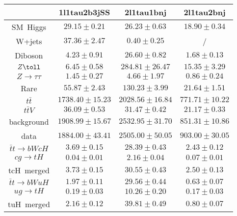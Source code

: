\begin{tabular}{|c|c|c|c|} \hline
 & 1l1tau2b3jSS & 2l1tau1bnj & 2l1tau2bnj\\\hline
SM~Higgs & $29.15\pm0.21$ & $26.23\pm0.63$ & $18.90\pm0.34$\\\hline
W+jets & $37.36\pm2.47$ & $0.40\pm0.25$ &  /\\\hline
Diboson & $4.23\pm0.91$ & $26.60\pm0.82$ & $1.68\pm0.13$\\\hline
$Z\toll$ & $6.45\pm0.58$ & $284.81\pm26.47$ & $15.35\pm3.29$\\\hline
$Z\to\tau\tau$ & $1.45\pm0.27$ & $4.66\pm1.97$ & $0.86\pm0.24$\\\hline
Rare & $55.87\pm2.43$ & $130.23\pm3.99$ & $21.64\pm1.51$\\\hline
$t\bar{t}$ & $1738.40\pm15.23$ & $2028.56\pm16.84$ & $771.71\pm10.22$\\\hline
$t\bar{t}V$ & $36.09\pm0.53$ & $31.47\pm0.42$ & $21.17\pm0.33$\\\hline
background & $1908.99\pm15.67$ & $2532.95\pm31.70$ & $851.31\pm10.86$\\\hline
data & $1884.00\pm43.41$ & $2505.00\pm50.05$ & $903.00\pm30.05$\\\hline
$\bar{t}t\to bWcH$ & $3.69\pm0.15$ & $28.39\pm0.43$ & $2.43\pm0.12$\\\hline
$cg\to tH$ & $0.04\pm0.01$ & $2.16\pm0.04$ & $0.07\pm0.01$\\\hline
tcH~merged & $3.73\pm0.15$ & $30.55\pm0.43$ & $2.50\pm0.13$\\\hline
$\bar{t}t\to bWuH$ & $1.97\pm0.11$ & $29.56\pm0.44$ & $0.63\pm0.07$\\\hline
$ug\to tH$ & $0.19\pm0.03$ & $10.26\pm0.20$ & $0.17\pm0.03$\\\hline
tuH~merged & $2.16\pm0.12$ & $39.81\pm0.49$ & $0.80\pm0.07$\\\hline
\end{tabular}
